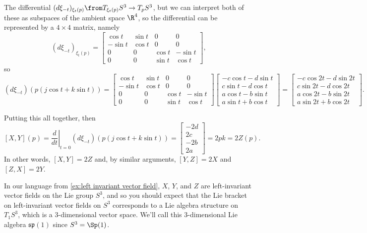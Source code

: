 The differential $(d\xi_{-t})_{\xi_t(p)}\from T_{\xi_t(p)}S^3 \to T_p S^3$, but we can interpret both of these as subspaces of the ambient space $\R^4$, so the differential can be represented by a $4 \times 4$ matrix, namely
\[
	(d \xi_{-t})_{\xi_t(p)} = \begin{bmatrix} \cos t& \sin t & 0 & 0 \\ -\sin t & \cos t & 0 & 0 \\ 0 & 0 & \cos t & -\sin t \\ 0 & 0 & \sin t & \cos t \end{bmatrix},
\]
so
\[
	(d\xi_{-t})(p(j\cos t + k \sin t)) = \begin{bmatrix} \cos t& \sin t & 0 & 0 \\ -\sin t & \cos t & 0 & 0 \\ 0 & 0 & \cos t & -\sin t \\ 0 & 0 & \sin t & \cos t \end{bmatrix} \begin{bmatrix} -c \cos t - d \sin t \\ c \sin t - d \cos t \\ a \cos t - b \sin t \\ a \sin t + b \cos t \end{bmatrix} = \begin{bmatrix} -c \cos 2t - d \sin 2t \\ c \sin 2t - d \cos 2t \\ a \cos 2t - b \sin 2t \\ a \sin 2t + b \cos 2t \end{bmatrix}.
\]

Putting this all together, then
\[
	[X,Y](p) =\left. \frac{d}{dt}\right|_{t=0} (d\xi_{-t})(p(j\cos t + k \sin t)) = \begin{bmatrix} -2d \\ 2c \\ -2b \\ 2a \end{bmatrix} = 2pk = 2Z(p).
\]
In other words, $[X,Y] = 2Z$ and, by similar arguments, $[Y,Z] = 2X$ and $[Z,X] = 2Y$.

In our language from \cref{ex:left invariant vector field}, $X$, $Y$, and $Z$ are left-invariant vector fields on the Lie group $S^3$, and so you should expect that the Lie bracket on left-invariant vector fields on $S^3$ corresponds to a Lie algebra structure on $T_1 S^3$, which is a 3-dimensional vector space. We'll call this 3-dimensional Lie algebra $\mathfrak{sp}(1)$ since $S^3 = \Sp(1)$. 

